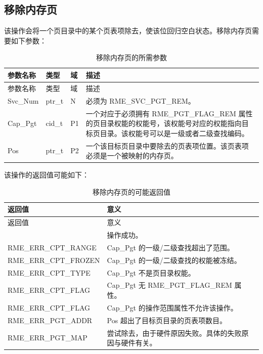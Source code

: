 \subsection{移除内存页}\label{subsec:3-remove-memory-page}

该操作会将一个页目录中的某个页表项除去，使该位回归空白状态。移除内存页需要如下参数：

\begin{xltabular}{\textwidth}{@{}>{\hsize\raggedright\arraybackslash}X>{\hsize\raggedright\arraybackslash}X>{\hsize\raggedright\arraybackslash}X>{\hsize\raggedright\arraybackslash}X@{}}
\caption{移除内存页的所需参数}\label{tab:3-16-remove-memory-page-parameters}\\
\toprule
参数名称 & 类型 & 域 & 描述\tabularnewline
\endfirsthead
\toprule
参数名称 & 类型 & 域 & 描述\tabularnewline
\midrule
\endhead
\bottomrule
\endlastfoot
Svc\_Num & ptr\_t & N & 必须为 RME\_SVC\_PGT\_REM。\tabularnewline
Cap\_Pgt & cid\_t & P1 &
一个对应于必须拥有 RME\_PGT\_FLAG\_REM 属性的页目录权能的权能号，该权能号对应的权能指向目标页目录。该权能号可以是一级或者二级查找编码。\tabularnewline
Pos & ptr\_t & P2 &
一个该目标页目录中要除去的页表项位置。该页表项必须是一个被映射的内存页。\tabularnewline
\end{xltabular}

该操作的返回值可能如下：

\begin{xltabular}{\textwidth}{@{}>{\hsize\raggedright\arraybackslash}X>{\hsize\raggedright\arraybackslash}X@{}}
\caption{移除内存页的可能返回值}\label{tab:3-17-remove-memory-page-return-values}\\
\toprule
返回值 & 意义\tabularnewline
\endfirsthead
\toprule
返回值 & 意义\tabularnewline
\midrule
\endhead
\bottomrule
{} & 操作成功。\tabularnewline
    RME\_ERR\_CPT\_RANGE & Cap\_Pgt 的一级/二级查找超出了范围。\tabularnewline
    RME\_ERR\_CPT\_FROZEN & Cap\_Pgt 的一级/二级查找的权能被冻结。\tabularnewline
    RME\_ERR\_CPT\_TYPE & Cap\_Pgt 不是页目录权能。\tabularnewline
    RME\_ERR\_CPT\_FLAG & Cap\_Pgt 无 RME\_PGT\_FLAG\_REM 属性。\tabularnewline
    RME\_ERR\_CPT\_FLAG & Cap\_Pgt 的操作范围属性不允许该操作。\tabularnewline
    RME\_ERR\_PGT\_ADDR & Pos 超出了目标页目录的页表项数目。\tabularnewline
    RME\_ERR\_PGT\_MAP & 尝试除去，由于硬件原因失败。具体的失败原因与硬件有关。\tabularnewline
\end{xltabular}

